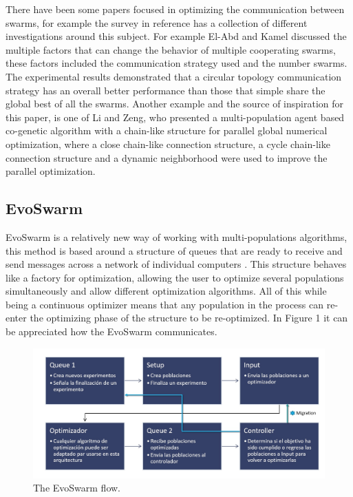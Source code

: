 \documentclass[runningheads]{llncs}
\begin{document}
There have been some papers focused in optimizing the communication between swarms, for example the survey in reference \cite{b15} has a collection of different investigations around this subject. For example El-Abd and Kamel discussed the multiple factors that can change the behavior of multiple cooperating swarms, these factors included the communication strategy used and the number swarms. The experimental results demonstrated that a circular topology communication strategy has an overall better performance than those that simple share the global best of all the swarms\cite{b16}.
Another example and the source of inspiration for this paper, is one of Li and Zeng, who presented a multi-population agent based co-genetic algorithm with a chain-like structure for parallel global numerical optimization, where a close chain-like connection structure, a cycle chain-like connection structure and a dynamic neighborhood were used to improve the parallel optimization\cite{b17}.


\subsection{EvoSwarm}

EvoSwarm is a relatively new way of working with multi-populations algorithms, this method is based around a structure of queues that are ready to receive and send messages across a network of individual computers \cite{b18}. This structure behaves like a factory for optimization, allowing the user to optimize several populations simultaneously and allow different optimization algorithms. All of this while being a continuous optimizer means that any population in the process can re-enter the optimizing phase of the structure to be re-optimized. In Figure 1 it can be appreciated how the EvoSwarm communicates.

\begin{figure}[h]
\centering
{}
\includegraphics[scale=.40]{Resources/F1-1.jpg}
\caption{The EvoSwarm flow.}
\label{fig:example}
\end{figure}
\end{document}
